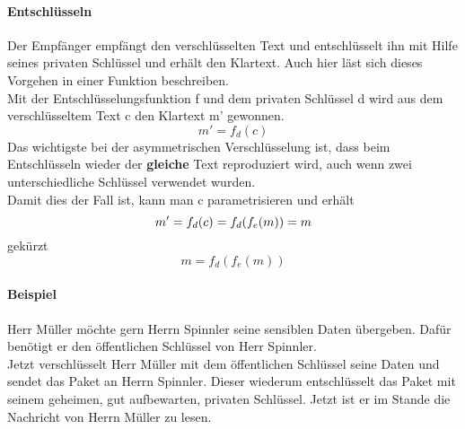\paragraph{Entschlüsseln}
Der Empfänger empfängt den verschlüsselten Text und entschlüsselt ihn mit Hilfe seines privaten Schlüssel und erhält den Klartext.
Auch hier läst sich dieses Vorgehen in einer Funktion beschreiben.\\
Mit der Entschlüsselungsfunktion f und dem privaten Schlüssel d wird aus dem verschlüsseltem Text c den Klartext m' gewonnen.
\begin{equation*}
  m' = f_d (c) 
  \label{eqn:asy_entsch}
\end{equation*}
Das wichtigste bei der asymmetrischen Verschlüsselung ist, dass beim Entschlüsseln wieder der \textbf{gleiche} Text reproduziert wird, auch wenn zwei unterschiedliche Schlüssel verwendet wurden.\\
Damit dies der Fall ist, kann man c parametrisieren und erhält
\begin{equation*}
  m' = f_d (c) = f_d (f_e (m) ) = m \\
  \label{eqn:asy_togh}
\end{equation*}
gekürzt\\
\begin{equation*}
  m = f_d ( f_e (m) )
  \label{eqn:asy_togh_shortForm}
\end{equation*}
\paragraph{Beispiel \footnotemark}
Herr Müller möchte gern Herrn Spinnler seine sensiblen Daten übergeben. Dafür benötigt er den öffentlichen Schlüssel von Herr Spinnler.\\
Jetzt verschlüsselt Herr Müller mit dem öffentlichen Schlüssel seine Daten und sendet das Paket an Herrn Spinnler. Dieser wiederum entschlüsselt das Paket mit seinem geheimen, gut aufbewarten, privaten Schlüssel. Jetzt ist er im Stande die Nachricht von Herrn Müller zu lesen.


